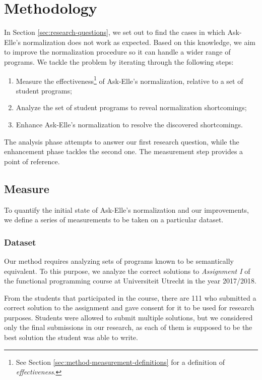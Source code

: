 \chapter{Methodology}
\label{sec:methodology}

In Section \ref{sec:research-questions}, we set out to find the cases in which Ask-Elle's normalization does not work as expected. Based on this knowledge, we aim to improve the normalization procedure so it can handle a wider range of programs. We tackle the problem by iterating through the following steps:

\begin{enumerate}
    \item Measure the effectiveness\footnote{See Section \ref{sec:method-measurement-definitions} for a definition of \emph{effectiveness}.} of Ask-Elle's normalization, relative to a set of student programs;
    \item Analyze the set of student programs to reveal normalization shortcomings;
    \item Enhance Ask-Elle's normalization to resolve the discovered shortcomings.
\end{enumerate}

The analysis phase attempts to answer our first research question, while the enhancement phase tackles the second one. The measurement step provides a point of reference.

\section{Measure}
\label{sec:method-measure}

To quantify the initial state of Ask-Elle's normalization and our improvements, we define a series of measurements to be taken on a particular dataset.

\subsection{Dataset}

Our method requires analyzing sets of programs known to be semantically equivalent. To this purpose, we analyze the correct solutions to \emph{Assignment I} of the functional programming course at Universiteit Utrecht in the year 2017/2018.

From the students that participated in the course, there are 111 who submitted a correct solution to the assignment and gave consent for it to be used for research purposes. Students were allowed to submit multiple solutions, but we considered only the final submissions in our research, as each of them is supposed to be the best solution the student was able to write.

